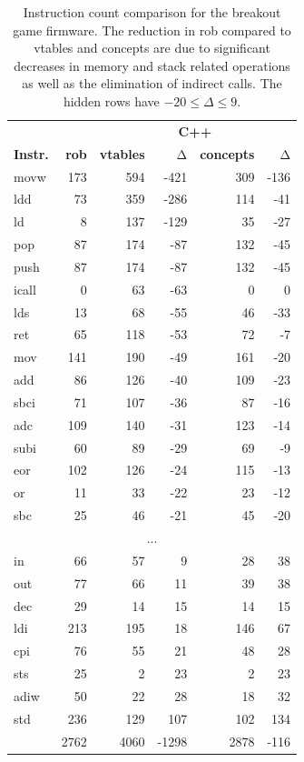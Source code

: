 \documentclass[sigconf]{acmart}
\begin{document}
\begin{table}[bp]
\caption{Instruction count comparison for the breakout game firmware. The reduction in rob compared to vtables and concepts are due to significant decreases in memory and stack related operations as well as the elimination of indirect calls. The hidden rows have $-20 \le \Delta \le 9$.}
\label{tb:mnemonicscount}
\begin{tabular}{lrrrrr}
\toprule
& & \multicolumn{4}{c}{\bf C++} \\
\cmidrule{3-6}
\bf Instr. & \bf rob & \bf vtables & Δ & \bf concepts & Δ \\
\midrule
movw & 173 & 594 & -421 & 309 & -136 \\
ldd & 73 & 359 & -286 & 114 & -41 \\
ld & 8 & 137 & -129 & 35 & -27 \\
pop & 87 & 174 & -87 & 132 & -45 \\
push & 87 & 174 & -87 & 132 & -45 \\
icall & 0 & 63 & -63 & 0 & 0 \\
lds & 13 & 68 & -55 & 46 & -33 \\
ret & 65 & 118 & -53 & 72 & -7 \\
mov & 141 & 190 & -49 & 161 & -20 \\
add & 86 & 126 & -40 & 109 & -23 \\
sbci & 71 & 107 & -36 & 87 & -16 \\
adc & 109 & 140 & -31 & 123 & -14 \\
subi & 60 & 89 & -29 & 69 & -9 \\
eor & 102 & 126 & -24 & 115 & -13 \\
or & 11 & 33 & -22 & 23 & -12 \\
sbc & 25 & 46 & -21 & 45 & -20 \\
\multicolumn{6}{c}{...} \\
in & 66 & 57 & 9 & 28 & 38 \\
out & 77 & 66 & 11 & 39 & 38 \\
dec & 29 & 14 & 15 & 14 & 15 \\
ldi & 213 & 195 & 18 & 146 & 67 \\
cpi & 76 & 55 & 21 & 48 & 28 \\
sts & 25 & 2 & 23 & 2 & 23 \\
adiw & 50 & 22 & 28 & 18 & 32 \\
std & 236 & 129 & 107 & 102 & 134 \\
\midrule
 & 2762 & 4060 & -1298 & 2878 & -116 \\
\bottomrule
\end{tabular}
\end{table}
\end{document}
